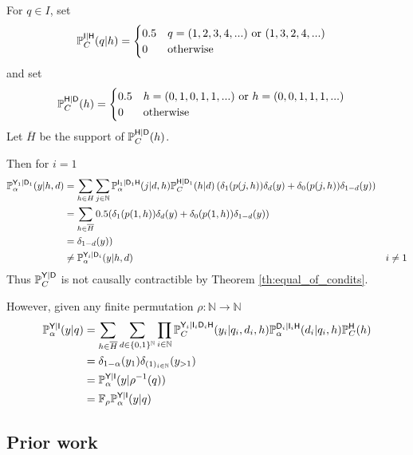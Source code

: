 \begin{example}
For $q\in I$, set
\begin{align}
    \mathbb{P}_C^{\mathsf{I}|\mathsf{H}}(q|h)&= \begin{cases}
        0.5 & q=(1,2,3,4,...) \text{ or } (1,3,2,4,...)\\
        0&\text{otherwise}
    \end{cases}
\end{align}
and set
\begin{align}
    \mathbb{P}_C^{\mathsf{H}|\mathsf{D}}(h) &= \begin{cases}
        0.5 & h=(0,1,0,1,1,...)\text{ or }h=(0,0,1,1,1,...)\\
        0 &\text{otherwise}
    \end{cases}
\end{align}
Let $\overline{H}$ be the support of $\mathbb{P}_C^{\mathsf{H}|\mathsf{D}}(h)$.

Then for $i=1$
\begin{align}
    \mathbb{P}_\alpha^{\mathsf{Y}_1|\mathsf{D}_1}(y|h,d) &= \sum_{h\in H} \sum_{j\in \mathbb{N}} \mathbb{P}_\alpha^{\mathsf{I}_1|\mathsf{D}_1\mathsf{H}}(j|d,h)\mathbb{P}_C^{\mathsf{H}|\mathsf{D}_1}(h|d)\left(\delta_1(p(j,h))\delta_d(y) + \delta_0(p(j,h))\delta_{1-d}(y)\right)\\
    &= \sum_{h\in \overline{H}} 0.5( \delta_1(p(1,h))\delta_d(y) + \delta_0(p(1,h))\delta_{1-d}(y))\\
    &= \delta_{1-d}(y))\\
    &\neq  \mathbb{P}_\alpha^{\mathsf{Y}_i|\mathsf{D}_i}(y|h,d) & i\neq 1
\end{align}
Thus $\mathbb{P}_C^{\mathsf{Y}|\mathsf{D}}$ is not causally contractible by Theorem \ref{th:equal_of_condits}. 

However, given any finite permutation $\rho:\mathbb{N}\to\mathbb{N}$
\begin{align}
    \mathbb{P}_\alpha^{\mathsf{Y}|\mathsf{I}}(y|q) &= \sum_{h\in \overline{H}}\sum_{d\in\{0,1\}^{\mathbb{N}}} \prod_{i\in \mathbb{N}} \mathbb{P}_C^{\mathsf{Y}_i|\mathsf{I}_i\mathsf{D}_i\mathsf{H}}(y_i|q_i,d_i,h) \mathbb{P}_\alpha^{\mathsf{D}_i|\mathsf{I}_i\mathsf{H}}(d_i|q_i,h)\mathbb{P}_C^{\mathsf{H}}(h)\\
    &= \delta_{1-\alpha}(y_1)\delta_{(1)_{i\in\mathbb{N}}}(y_{>1})\\
    &= \mathbb{P}_\alpha^{\mathsf{Y}|\mathsf{I}}(y|\rho^{-1}(q))\\
    &= \mathbb{F}_{\rho}\mathbb{P}_\alpha^{\mathsf{Y}|\mathsf{I}}(y|q)
\end{align}
\end{example}

\subsection{Prior work}

